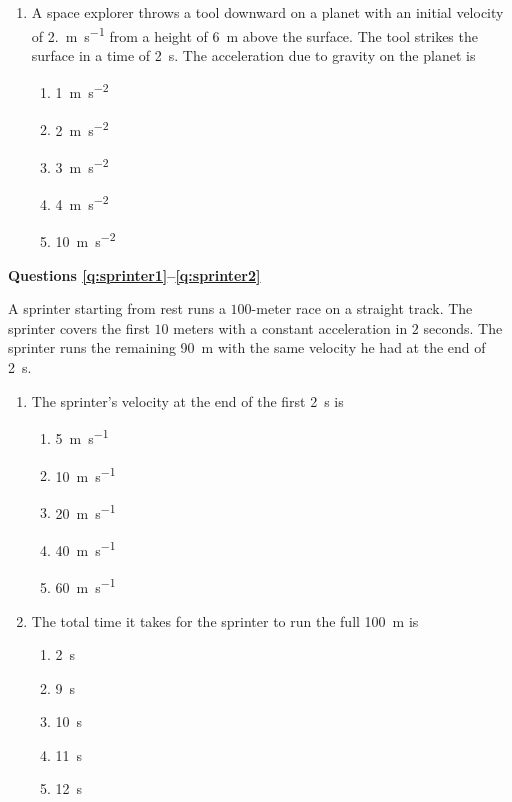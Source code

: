 \documentclass{../../../oss-classkick}
\begin{document}
\begin{multicols*}{2}
\begin{enumerate}[leftmargin=18pt]
  \item A space explorer throws a tool downward on a planet with an initial
    velocity of \SI{2.}{\metre\per\second} from a height of \SI{6}{\metre}
    above the surface. The tool strikes the surface in a time of
    \SI{2}{\second}. The acceleration due to gravity on the planet is
    \begin{enumerate}[nosep,leftmargin=18pt,label=(\Alph*)]
    \item\SI{1}{\metre\per\second\squared}
    \item\SI{2}{\metre\per\second\squared}
    \item\SI{3}{\metre\per\second\squared}
    \item\SI{4}{\metre\per\second\squared}
    \item\SI{10}{\metre\per\second\squared}
    \end{enumerate}
  \end{enumerate}

  \textbf{Questions \ref{q:sprinter1}--\ref{q:sprinter2}}
  
  A sprinter starting from rest runs a $100$-meter race on a straight track. The
  sprinter covers the first $10$ meters with a constant acceleration in $2$
  seconds. The sprinter runs the remaining \SI{90}{\metre} with the same
  velocity he had at the end of \SI{2}{\second}.

  \begin{enumerate}[resume,leftmargin=18pt]
  \item The sprinter's velocity at the end of the first \SI{2}{\second} is
    \begin{enumerate}[nosep,leftmargin=18pt,label=(\Alph*)]
    \item\SI{5}{\metre\per\second}
    \item\SI{10}{\metre\per\second}
    \item\SI{20}{\metre\per\second}
    \item\SI{40}{\metre\per\second}
    \item\SI{60}{\metre\per\second}
    \end{enumerate}
    \label{q:sprinter1}

  \item The total time it takes for the sprinter to run the full
    \SI{100}{\metre} is
    \begin{enumerate}[nosep,leftmargin=18pt,label=(\Alph*)]
    \item\SI{2}{\second}
    \item\SI{9}{\second}
    \item\SI{10}{\second}
    \item\SI{11}{\second}
    \item\SI{12}{\second}
    \end{enumerate}
    \label{q:sprinter2}
    

\end{enumerate}
\end{multicols*}
\end{document}
